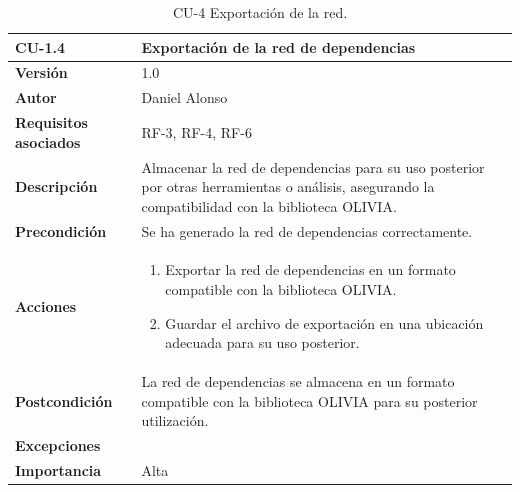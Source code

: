 \begin{table}[p]
	\centering
	\begin{tabularx}{\linewidth}{ p{} p{} }
		\toprule
		\textbf{CU-1.4}               & \textbf{Exportación de la red de dependencias}                                                                                                   \\
		\toprule
		\textbf{Versión}              & 1.0                                                                                                                                              \\
		\textbf{Autor}                & Daniel Alonso                                                                                                                                    \\
		\textbf{Requisitos asociados} & RF-3, RF-4, RF-6                                                                                                                                 \\
		\textbf{Descripción}          & Almacenar la red de dependencias para su uso posterior por otras herramientas o análisis, asegurando la compatibilidad con la biblioteca OLIVIA. \\
		\textbf{Precondición}         & Se ha generado la red de dependencias correctamente.                                                                                             \\
		\textbf{Acciones}             &
		\begin{enumerate}
			\def\labelenumi{\arabic{enumi}.}
			\tightlist
			\item Exportar la red de dependencias en un formato compatible con la biblioteca OLIVIA.
			\item Guardar el archivo de exportación en una ubicación adecuada para su uso posterior.
		\end{enumerate}                                                                                          \\
		\textbf{Postcondición}        & La red de dependencias se almacena en un formato compatible con la biblioteca OLIVIA para su posterior utilización.                              \\
		\textbf{Excepciones}          &                                                                                                                                                  \\
		\textbf{Importancia}          & Alta                                                                                                                                             \\
		\bottomrule
	\end{tabularx}
	\caption{CU-4 Exportación de la red.}
	\label{tab:cu4}
\end{table}

